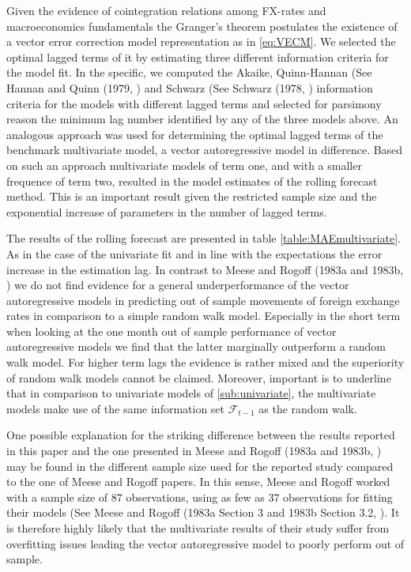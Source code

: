 Given the evidence of cointegration relations among FX-rates and macroeconomics fundamentals the Granger's theorem postulates the existence of
a vector error correction model representation as in \ref{eq:VECM}. We selected the optimal lagged terms of it by estimating three different
information criteria for the model fit. In the specific, we computed the Akaike, Quinn-Hannan (See Hannan and Quinn (1979, \cite{QuinnHannan})
and Schwarz (See Schwarz (1978, \cite{Schwarz}) information criteria for the models with different lagged terms and selected
for parsimony reason the minimum lag number identified by any of the three models above. An analogous approach was used for determining
the optimal lagged terms of the benchmark multivariate model, a vector autoregressive model in difference. Based on such an approach multivariate models
of term one, and with a smaller frequence of term two, resulted in the model estimates of the rolling forecast method.
This is an important result given the restricted sample size and the exponential increase of parameters in the number of lagged terms.

The results of the rolling forecast are presented in table \ref{table:MAEmultivariate}. As in the case of the univariate fit and in line
with the expectations the error increase in the estimation lag. In contrast to Meese and Rogoff (1983a and 1983b,
\cite{MeeseRogoffa, MeeseRogoffb}) we do not find evidence for a general underperformance of the vector autoregressive models in predicting out of
sample movements of foreign exchange rates in comparison to a simple random walk model. Especially in the short term when looking at the one month
out of sample performance of vector autoregressive models we find that the latter marginally outperform a random walk model. For higher term lags the
evidence is rather mixed and the superiority of random walk models cannot be claimed. Moreover, important is to underline that in comparison to
univariate models of \ref{sub:univariate}, the multivariate models make use of the same information set $\mathscr{F}_{t-1}$ as the random walk.

One possible explanation for the striking difference between the results reported in this paper and the one presented in Meese and Rogoff (1983a and 1983b,
\cite{MeeseRogoffa, MeeseRogoffb}) may be found in the different sample size used for the reported study compared to the one of Meese and Rogoff papers.
In this sense, Meese and Rogoff worked with a sample size of 87 observations, using as few as 37 observations for fitting
their models (See Meese and Rogoff (1983a Section 3 and 1983b Section 3.2, \cite{MeeseRogoffa, MeeseRogoffb}).
It is therefore highly likely that the multivariate results of their study suffer from overfitting issues leading the vector
autoregressive model to poorly perform out of sample.

